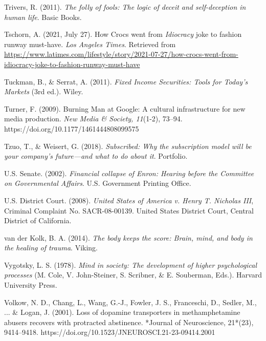 \begin{thebibliography}{}
    Trivers, R. (2011). \textit{The folly of fools: The logic of deceit and self-deception in human life}. Basic Books.

    Tschorn, A. (2021, July 27). How Crocs went from \textit{Idiocracy} joke to fashion runway must-have. \textit{Los Angeles Times}. Retrieved from \url{https://www.latimes.com/lifestyle/story/2021-07-27/how-crocs-went-from-idiocracy-joke-to-fashion-runway-must-have}

    Tuckman, B., \& Serrat, A. (2011). \textit{Fixed Income Securities: Tools for Today's Markets} (3rd ed.). Wiley.

    Turner, F. (2009). Burning Man at Google: A cultural infrastructure for new media production. \textit{New Media \& Society, 11}(1-2), 73–94. https://doi.org/10.1177/1461444808099575

    Tzuo, T., \& Weisert, G. (2018). \textit{Subscribed: Why the subscription model will be your company's future—and what to do about it}. Portfolio.


    U.S. Senate. (2002). \textit{Financial collapse of Enron: Hearing before the Committee on Governmental Affairs}. U.S. Government Printing Office.

    U.S. District Court. (2008). \textit{United States of America v. Henry T. Nicholas III}, Criminal Complaint No. SACR-08-00139. United States District Court, Central District of California.


    van der Kolk, B. A. (2014). \textit{The body keeps the score: Brain, mind, and body in the healing of trauma}. Viking.

    Vygotsky, L. S. (1978). \textit{Mind in society: The development of higher psychological processes} (M. Cole, V. John-Steiner, S. Scribner, \& E. Souberman, Eds.). Harvard University Press.

    Volkow, N. D., Chang, L., Wang, G.-J., Fowler, J. S., Franceschi, D., Sedler, M., ... \& Logan, J. (2001). Loss of dopamine transporters in methamphetamine abusers recovers with protracted abstinence. *Journal of Neuroscience, 21*(23), 9414–9418. https://doi.org/10.1523/JNEUROSCI.21-23-09414.2001


\end{thebibliography}
